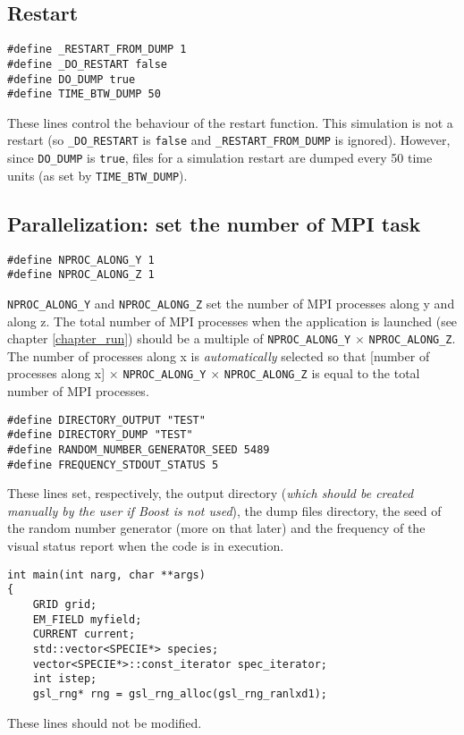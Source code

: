 \documentclass[11pt,a4paper]{report}
\begin{document}
\subsection*{Restart}
\begin{lstlisting}
#define _RESTART_FROM_DUMP 1
#define _DO_RESTART false
#define DO_DUMP true
#define TIME_BTW_DUMP 50
\end{lstlisting}
These lines control the behaviour of the restart function.
This simulation is not a restart (so \verb+_DO_RESTART+ is \verb+false+ and \verb+_RESTART_FROM_DUMP+ is
ignored). However, since \verb+DO_DUMP+ is \verb+true+, files for a simulation restart are dumped every 50 time units (as set by \verb+TIME_BTW_DUMP+).

\subsection*{Parallelization: set the number of MPI task}
\begin{lstlisting}
#define NPROC_ALONG_Y 1
#define NPROC_ALONG_Z 1
\end{lstlisting}
\verb+NPROC_ALONG_Y+ and \verb+NPROC_ALONG_Z+ set the number of MPI processes along y and along z. 
The total number of MPI processes when the application is launched (see chapter \ref{chapter_run}) should be a multiple of \verb+NPROC_ALONG_Y+ $\times$ \verb+NPROC_ALONG_Z+. The number of processes along x is \emph{automatically} selected so that [number of processes along x] $\times$ \verb+NPROC_ALONG_Y+ $\times$ \verb+NPROC_ALONG_Z+ is equal to the total number of MPI processes.
\begin{lstlisting}
#define DIRECTORY_OUTPUT "TEST"
#define DIRECTORY_DUMP "TEST"
#define RANDOM_NUMBER_GENERATOR_SEED 5489
#define FREQUENCY_STDOUT_STATUS 5
\end{lstlisting}
These lines set, respectively, the output directory (\emph{which should be created manually by the user if Boost is not used}), the dump files directory, the seed of the random number generator (more on that later) and the frequency of the visual status report when the code is in execution.
\begin{lstlisting}[backgroundcolor=\color{no_modify}]
int main(int narg, char **args)
{
	GRID grid;
	EM_FIELD myfield;
	CURRENT current;
	std::vector<SPECIE*> species;
	vector<SPECIE*>::const_iterator spec_iterator;
	int istep;
	gsl_rng* rng = gsl_rng_alloc(gsl_rng_ranlxd1);
\end{lstlisting}
These lines should not be modified.
\end{document}
